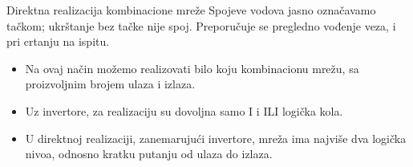 \begin{frame}[label=02-s023]{Direktna realizacija kombinacione mreže}
\vspace{2mm}
Spojeve vodova jasno označavamo tačkom; ukrštanje bez tačke nije spoj. Preporučuje se pregledno vođenje veza, i pri crtanju na ispitu.
\par\vspace{4mm}
\vspace{2mm}
\begin{itemize}
\item Na ovaj način možemo realizovati bilo koju kombinacionu mrežu, sa proizvoljnim brojem ulaza i izlaza.
\item Uz invertore, za realizaciju su dovoljna samo \alert{I i ILI logička kola}.
\item U direktnoj realizaciji, zanemarujući invertore, mreža ima \alert{najviše dva logička nivoa}, odnosno kratku putanju od ulaza do izlaza.
\end{itemize}
\end{frame}

